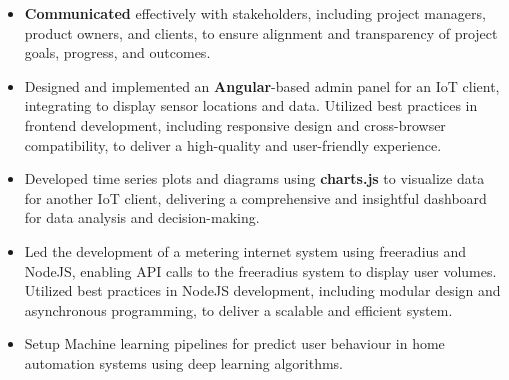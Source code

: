 \begin{itemize}
  \item \textbf{Communicated} effectively with stakeholders, including project managers, product owners, and clients,
    to ensure alignment and transparency of project goals, progress, and outcomes.
  \item Designed and implemented an \textbf{Angular}-based admin panel for an IoT client,
    integrating  to display sensor locations and data.
    Utilized best practices in frontend development, including responsive design and cross-browser compatibility, to deliver a high-quality and user-friendly experience.
  \item Developed time series plots and diagrams using \textbf{charts.js} to visualize data for another IoT client,
    delivering a comprehensive and insightful dashboard for data analysis and decision-making.
  \item Led the development of a metering internet system using freeradius and NodeJS, enabling API calls to the freeradius system to display user volumes.
    Utilized best practices in NodeJS development, including modular design and asynchronous programming, to deliver a scalable and efficient system.
  \item Setup Machine learning pipelines for predict user behaviour in home automation systems using deep learning algorithms.
\end{itemize}

